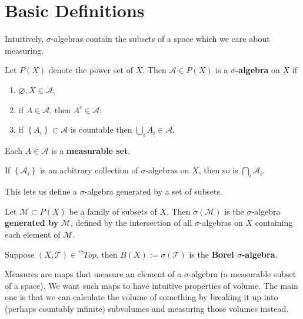 \documentclass[twoside,10pt]{article}
\begin{document}
\toc
\footer


\section{Basic Definitions}

Intuitively, $\sigma$-algebras contain the subsets of a space which we care about measuring.

\begin{defn}[]
Let $P(X)$ denote the power set of $X$. Then $\mathcal{A} \in P(X)$ is a $\sigma$\textbf{-algebra} on $X$ if
\begin{enumerate}
	\item $\varnothing, X \in \mathcal{A}$;
	\item if $A \in \mathcal{A}$, then $A^{c} \in \mathcal{A}$;
	\item if $\left\{ A_{i} \right\} \subset \mathcal{A}$ is countable then $\bigcup_{i}A_{i} \in \mathcal{A}$.
\end{enumerate}
Each $A \in \mathcal{A}$ is a \textbf{measurable set}.
\end{defn}

\begin{prop}
If $\left\{ \mathcal{A}_i \right\}$ is an arbitrary collection of $\sigma$-algebras on $X$, then so is $\bigcap_{i}\mathcal{A}_{i}$.
\end{prop}

This lets us define a $\sigma$-algebra generated by a set of subsets.

\begin{defn}[]
Let $\mathcal{M} \subset P(X)$ be a family of subsets of $X$. Then $\sigma(\mathcal{M})$ is the $\sigma$-algebra \textbf{generated by} $\mathcal{M}$, defined by the intersection of all $\sigma$-algebras on $X$ containing each element of $\mathcal{M}$.
\end{defn}

\begin{ex}[]
Suppose $(X,\mathcal{T}) \in \cat{Top}$, then $B(X) := \sigma(\mathcal{T})$ is the \textbf{Borel $\sigma$-algebra}.
\end{ex}

Measures are maps that measure an element of a $\sigma$-algebra (a measurable subset of a space). We want such maps to have intuitive properties of volume. The main one is that we can calculate the volume of something by breaking it up into (perhaps countably infinite) subvolumes and measuring those volumes instead.
\end{document}

